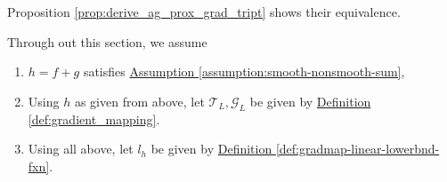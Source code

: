 \documentclass[12pt]{article}
\begin{document}
    {Proposition \ref*{prop:derive_ag_prox_grad_tript}} 
    shows their equivalence. 
    \par
    Through out this section, we assume 
    \begin{enumerate}
        \item $h=f + g$ satisfies 
            \hyperref[assumption:smooth-nonsmooth-sum]
            {Assumption \ref*{assumption:smooth-nonsmooth-sum}}, 
        \item Using $h$ as given from above, let $\mathcal T_L, \mathcal G_L$ be given by 
            \hyperref[def:gradient_mapping]
            {Definition \ref*{def:gradient_mapping}}. 
        \item Using all above, let $l_h$ be given by 
            \hyperref[def:gradmap-linear-lowerbnd-fxn]
            {Definition \ref*{def:gradmap-linear-lowerbnd-fxn}}. 
    \end{enumerate}
\end{document}
